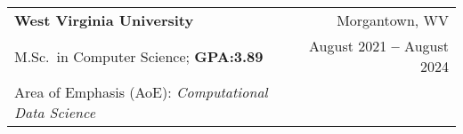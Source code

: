 \documentclass[letterpaper,11pt]{article}
\makeatletter
\newcommand{\resumeEducationHeadingMSc}[9]{
  \vspace{-2pt}\item
  \begin{tabular*}{0.97\textwidth}[t]{p{0.70\textwidth}@{\extracolsep{\fill}}r}
      \textbf{#1} & #2 \\
      \small#3 & \small #4 \\
      \hspace{.5cm}\parbox{0.6\textwidth}{\small#5} \\ %
      \hspace{.5cm}\parbox{0.6\textwidth}{\small#6} \\ %
      \small#7 & \small #8 \\
      \hspace{.5cm}\parbox{0.6\textwidth}{\small#9} \\
    \end{tabular*}\vspace{-5pt}
}
\newcommand{\resumeSubHeadingListStart}{\begin{itemize}[leftmargin=0.15in, label={}]}
\newcommand{\resumeSubHeadingListEnd}{\end{itemize}}
\makeatother
\begin{document}
    \resumeEducationHeadingMSc
      {West Virginia University
      }{Morgantown, WV}
      {M.Sc.\ in Computer Science; \textbf{GPA:\@ 3.89}
      }{August 2021 \textbf{--} August 2024}
      {Area of Emphasis (AoE): \textit{Computational Data Science}}
      {\href{https://researchrepository.wvu.edu/etd/12607}{Thesis: \textit{A Domain Adaptation Approach for Morphology-independent Cell Instance Segmentation}}}
      {Graduate Certificate in GIS and Spatial Analysis; \textbf{GPA:\@ 4.00}
      }{}
      {Coursework: \textit{Geospatial Modeling, Spatial Hydrology, Advanced Spatial Analysis in Resource Management, Open-Source Spatial Analytics, Spatial Analyst Project}}

      
    
\end{document}
